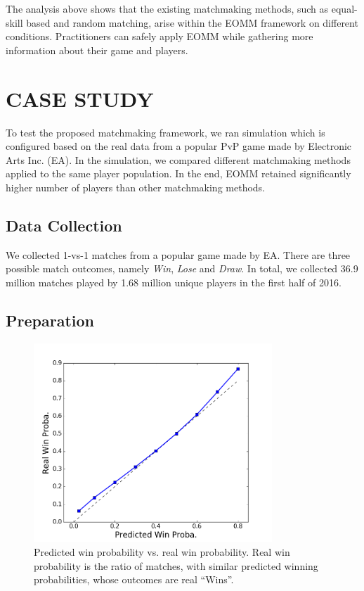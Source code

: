 The analysis above shows that the existing matchmaking methods, such as equal-skill based and random matching, arise within the EOMM framework on different conditions. Practitioners can safely apply EOMM while gathering more information about their game and players.

\section{CASE STUDY}\label{sec:casestudy}
To test the proposed matchmaking framework, we ran simulation which is configured  based on the real data from a popular PvP game made by Electronic Arts Inc.\! (EA). In the simulation, we compared different matchmaking methods applied to the same player population. In the end, EOMM retained significantly higher number of players than other matchmaking methods.

\subsection{Data Collection}
We collected 1-vs-1 matches from a popular game made by EA. There are three possible match outcomes, namely \emph{Win}, \emph{Lose} and \emph{Draw}. In total, we collected 36.9 million matches played by 1.68 million unique players in the first half of 2016.

\subsection{Preparation}\label{sec:preprosessing}

\begin{figure}[t]
\centering
\includegraphics[width=0.8\textwidth]{Figures/prob_calib_glicko_line.png}
\caption{Predicted win probability vs. real win probability. Real win probability is the ratio of matches, with similar predicted winning probabilities, whose outcomes are real ``Wins''.  }
\label{fig:glicko_cali}
\end{figure}


